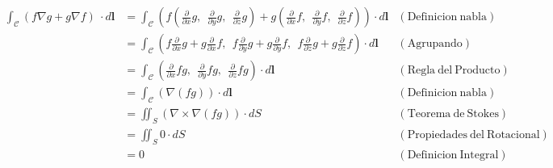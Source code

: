 \documentclass{article}
\begin{document}
\begin{enumerate}
{            \begin{align*}
                \int_{\mathcal{C}} {{\left(f \nabla g + g \nabla f\right)}\ \cdot d\mathbf{l}}
				&= \int_{\mathcal{C}} \left(f \left(\frac{\partial}{\partial x} g,\ \ \frac{\partial}{\partial y}g,\ \ \frac{\partial}{\partial z}g\right) + g \left(\frac{\partial}{\partial x} f,\ \ \frac{\partial}{\partial y}f,\ \ \frac{\partial}{\partial z}f\right)\right) \cdot d\mathbf{l} &\mathrm{(Definicion \ nabla)}\\
				&=\int_{\mathcal{C}}\left(f\frac{\partial}{\partial x} g + g\frac{\partial}{\partial x} f ,\ \ f \frac{\partial}{\partial y} g + g\frac{\partial}{\partial y} f ,\ \ f \frac{\partial}{\partial z} g + g \frac{\partial}{\partial z} f \right) \cdot d\mathbf{l} & \mathrm{(Agrupando)}\\
                &= \int_{\mathcal{C}}\left(\frac{\partial}{\partial x} fg,\ \ \frac{\partial}{\partial y}fg,\ \ \frac{\partial}{\partial z}fg\right) \cdot d\mathbf{l} &\mathrm{(Regla \ del \  Producto)}\\
&=\int_{\mathcal{C}}(\nabla(fg)) \cdot d\mathbf{l} &\mathrm{(Definicion \ nabla)}\\
&=\iint_{S} (\nabla \times \nabla(fg)) \cdot dS &\mathrm{(Teorema \ de \ Stokes)}\\
&=\iint_{S} 0 \cdot dS &\mathrm{(Propiedades \ del \ Rotacional)}\\
&= 0 &\mathrm{(Definicion \ Integral)}
            \end{align*}



        }
    \end{enumerate}
\end{document}
